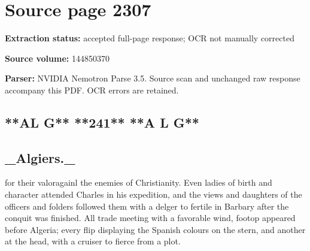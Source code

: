 \clearpage
\section{Source page 2307}
\textbf{Extraction status:} accepted full-page response; OCR not manually corrected\par
\textbf{Source volume:} 144850370\par
\textbf{Parser:} NVIDIA Nemotron Parse 3.5. Source scan and unchanged raw response accompany this PDF. OCR errors are retained.\par\medskip
\subsection*{**AL G** **241** **A L G**}
\subsection*{\_Algiers.\_}
for their valoragainl the enemies of Christianity. Even ladies of birth and character attended Charles in his expedition, and the views and daughters of the officers and folders followed them with a delger to fertile in Barbary after the conquit was finished. All trade meeting with a favorable wind, footop appeared before Algeria; every flip displaying the Spanish colours on the stern, and another at the head, with a cruiser to fierce from a plot.\par\medskip
